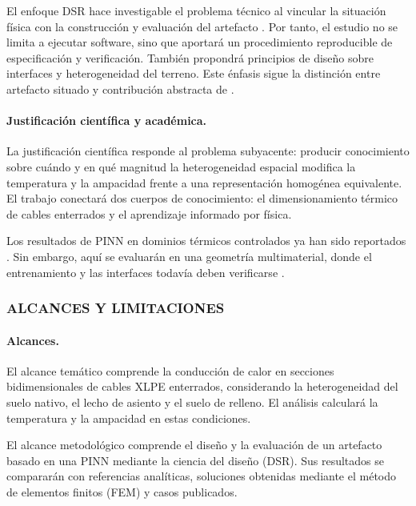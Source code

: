 \documentclass[11pt,a4paper,oneside]{report}
\begin{document}
El enfoque DSR hace investigable el problema técnico al vincular la situación física con la construcción y evaluación del artefacto \parencite[55--56]{peffers2007}. Por tanto, el estudio no se limita a ejecutar software, sino que aportará un procedimiento reproducible de especificación y verificación. También propondrá principios de diseño sobre interfaces y heterogeneidad del terreno. Este énfasis sigue la distinción entre artefacto situado y contribución abstracta de \textcite[342--350]{gregor2013}.

\paragraph{Justificación científica y académica.}

La justificación científica responde al problema subyacente: producir conocimiento sobre cuándo y en qué magnitud la heterogeneidad espacial modifica la temperatura y la ampacidad frente a una representación homogénea equivalente. El trabajo conectará dos cuerpos de conocimiento: el dimensionamiento térmico de cables enterrados y el aprendizaje informado por física.

Los resultados de PINN en dominios térmicos controlados ya han sido reportados \parencites[1--3,17]{xing2023}[1,3,16]{pan2025}. Sin embargo, aquí se evaluarán en una geometría multimaterial, donde el entrenamiento y las interfaces todavía deben verificarse \parencite[2--6]{ren2025}.

\subsubsection{ALCANCES Y LIMITACIONES}

\paragraph{Alcances.}

El alcance temático comprende la conducción de calor en secciones bidimensionales de cables XLPE enterrados, considerando la heterogeneidad del suelo nativo, el lecho de asiento y el suelo de relleno. El análisis calculará la temperatura y la ampacidad en estas condiciones.

El alcance metodológico comprende el diseño y la evaluación de un artefacto basado en una PINN mediante la ciencia del diseño (DSR). Sus resultados se compararán con referencias analíticas, soluciones obtenidas mediante el método de elementos finitos (FEM) y casos publicados.
\end{document}
